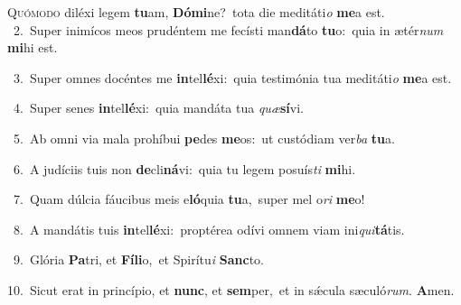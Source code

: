 \lettrine{\initial\textcolor{\initialcolor}{Q}}{uómodo} diléxi legem \textbf{tu}\-am, \textbf{Dó}\-\textbf{mi}ne?~\star tota die meditáti\textit{o} \textbf{me}\-a est.\\
{\numbfont\textcolor{\numbcolor}{~2.}}~Super inimícos meos prudéntem me fecísti man\-\textbf{dá}\-to \textbf{tu}\-o:~\star quia in ætér\textit{num} \textbf{mi}\-hi est.\par
{\numbfont\textcolor{\numbcolor}{~3.}}~Super omnes docéntes me \textbf{in}\-tel\-\textbf{lé}\-xi:~\star quia testimónia tua meditáti\textit{o} \textbf{me}\-a est.\par
{\numbfont\textcolor{\numbcolor}{~4.}}~Super senes \textbf{in}\-tel\-\textbf{lé}\-xi:~\star quia mandáta tua \textit{quæ}\-\textbf{sí}vi.\par
{\numbfont\textcolor{\numbcolor}{~5.}}~Ab omni via mala prohíbui \textbf{pe}\-des \textbf{me}\-os:~\star ut custódiam ver\textit{ba} \textbf{tu}\-a.\par
{\numbfont\textcolor{\numbcolor}{~6.}}~A judíciis tuis non \textbf{de}\-cli\-\textbf{ná}\-vi:~\star quia tu legem posuís\textit{ti} \textbf{mi}\-hi.\par
{\numbfont\textcolor{\numbcolor}{~7.}}~Quam dúlcia fáucibus meis e\-\textbf{ló}\-quia \textbf{tu}\-a,~\star super mel o\textit{ri} \textbf{me}\-o!\par
{\numbfont\textcolor{\numbcolor}{~8.}}~A mandátis tuis \textbf{in}\-tel\-\textbf{lé}\-xi:~\star proptérea odívi omnem viam ini\-\textit{qui}\-\textbf{tá}tis.\par
{\numbfont\textcolor{\numbcolor}{~9.}}~Glória \textbf{Pa}\-tri, et \textbf{Fí}\-\textbf{li}o,~\star et Spirítu\textit{i} \textbf{Sanc}\-to.\par
{\numbfont\textcolor{\numbcolor}{10.}}~Sicut erat in princípio, et \textbf{nunc}\-, et \textbf{sem}\-per,~\star et in sǽcula sæculó\-\textit{rum}\-. \textbf{A}\-men.\par
